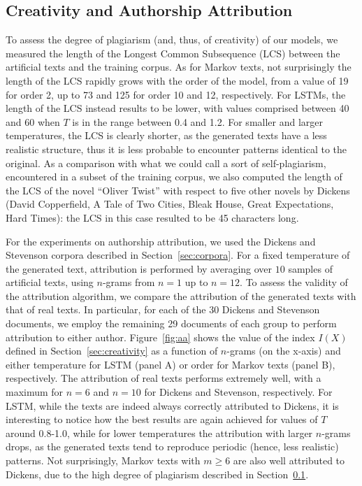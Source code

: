 \documentclass[journal]{IEEEtran}
\begin{document}
\subsection{Creativity and Authorship Attribution}\label{sec:exp_creativity}

To assess the degree of plagiarism (and, thus, of creativity) of our models, we measured the length of the Longest Common Subsequence
(LCS) between the artificial texts and the training corpus. As for Markov texts, not surprisingly the length of the LCS rapidly grows
with the order of the model, from a value of 19 for order 2, up to 73 and
125 for order 10 and 12, respectively. For LSTMs, the length of the LCS
instead results to be lower, with values comprised between 40 and 60 when $T$ is in the range between 0.4 and 1.2. For smaller and larger
temperatures, the LCS is clearly shorter, as the generated texts
have a less realistic structure, thus it is less probable to encounter
patterns identical to the original.
As a comparison with what we could call a sort of self-plagiarism,
encountered in a subset of the training corpus, we also computed
the length of the LCS of the novel ``Oliver Twist'' with respect to five other novels by Dickens (David Copperfield,
A Tale of Two Cities, Bleak House, Great Expectations, Hard Times): the LCS in this case resulted to be 45 characters long.

For the experiments on authorship attribution, we used the Dickens and Stevenson
corpora described in Section~\ref{sec:corpora}. For a fixed temperature of the
generated text, attribution is performed by averaging over $10$ samples of
artificial texts, using $n$-grams from $n=1$ up to $n=12$. %
To assess the validity of the attribution algorithm, we
compare the attribution of the generated texts with that of real texts. In
particular, for each of the 30 Dickens and Stevenson documents, we employ the
remaining 29 documents of each group to perform attribution to either author. Figure~\ref{fig:aa} shows the value of the index $I(X)$ defined
in Section~\ref{sec:creativity} as a function of $n$-grams (on the x-axis) and
either temperature for LSTM (panel A) or order for Markov texts (panel B), respectively.
The attribution of real texts performs extremely well, with a maximum for $n=6$ and
$n=10$ for Dickens and Stevenson, respectively. For LSTM, while the texts are indeed always
correctly attributed to Dickens, it is interesting to notice how the best
results are again achieved for values of $T$ around 0.8-1.0, while for
lower temperatures the attribution with larger $n$-grams drops,
as the generated texts tend to reproduce periodic (hence, less realistic)
patterns. Not surprisingly, Markov texts with $m \ge 6$ are also well attributed
to Dickens, due to the high degree of plagiarism described in Section~\ref{sec:exp_creativity}.
\end{document}
